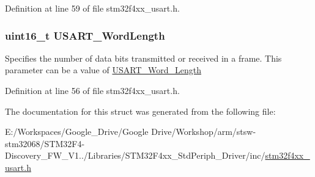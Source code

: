 Definition at line 59 of file stm32f4xx\-\_\-usart.\-h.

\hypertarget{struct_u_s_a_r_t___init_type_def_aa1248b67914e095c0de768223eea9328}{
\subsubsection[{U\-S\-A\-R\-T\-\_\-\-Word\-Length}]{\setlength{\rightskip}{0pt plus 5cm}uint16\-\_\-t U\-S\-A\-R\-T\-\_\-\-Word\-Length}}\label{struct_u_s_a_r_t___init_type_def_aa1248b67914e095c0de768223eea9328}
Specifies the number of data bits transmitted or received in a frame. This parameter can be a value of \hyperlink{group___u_s_a_r_t___word___length}{U\-S\-A\-R\-T\-\_\-\-Word\-\_\-\-Length} 

Definition at line 56 of file stm32f4xx\-\_\-usart.\-h.



The documentation for this struct was generated from the following file\-:\begin{DoxyCompactItemize}
\item 
E\-:/\-Workspaces/\-Google\-\_\-\-Drive/\-Google Drive/\-Workshop/arm/stsw-\/stm32068/\-S\-T\-M32\-F4-\/\-Discovery\-\_\-\-F\-W\-\_\-\-V1../\-Libraries/\-S\-T\-M32\-F4xx\-\_\-\-Std\-Periph\-\_\-\-Driver/inc/\hyperlink{stm32f4xx__usart_8h}{stm32f4xx\-\_\-usart.\-h}\end{DoxyCompactItemize}
